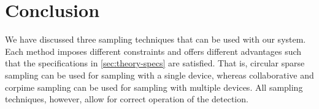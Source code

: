 \documentclass[a4paper, openany, oneside]{memoir}
\begin{document}
\section{Conclusion}
We have discussed three sampling techniques that can be used with our system. Each method imposes different constraints and offers different advantages such that the specifications in \cref{sec:theory-specs} are satisfied. That is, circular sparse sampling can be used for sampling with a single device, whereas collaborative and corpime sampling can be used for sampling with multiple devices.  All sampling techniques, however, allow for correct operation of the detection.
\end{document}
